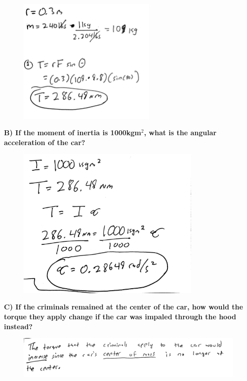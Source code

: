 \documentclass[a4paper,12pt]{article}
\begin{document}
\begin{figure}[H]
    \centering
    \includegraphics[width=0.6\textwidth]{U5_P1_A.jpg} %
\end{figure} 

\newpage

\noindent\textbf{B) If the moment of inertia is 1000kgm$^2$, what is the angular acceleration of the car?} \\


\begin{figure}[H]
    \centering
    \includegraphics[width=0.8\textwidth]{U5_P1_B.jpg} %
\end{figure} 


\noindent\textbf{C) If the criminals remained at the center of the car, how would the torque they apply change if the car was impaled through the hood instead?} \\


\begin{figure}[H]
    \centering
    \includegraphics[width=1\textwidth]{U5_P1_C.jpg} %
\end{figure} 
\end{document}
